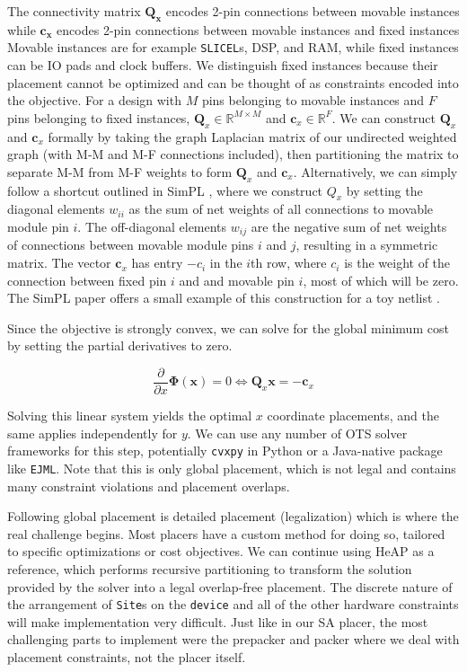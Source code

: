 The connectivity matrix $\boldsymbol{Q_x}$ encodes 2-pin connections between movable instances while $\boldsymbol{c_x}$ encodes 2-pin connections between movable instances and fixed instances   
Movable instances are for example \texttt{SLICEL}s, DSP, and RAM, while fixed instances can be IO pads and clock buffers.
We distinguish fixed instances because their placement cannot be optimized and can be thought of as constraints encoded into the objective.
For a design with $M$ pins belonging to movable instances and $F$ pins belonging to fixed instances, $\boldsymbol{Q}_x \in {\mathbb{R}}^{M \times M}$ and $\boldsymbol{c}_x \in {\mathbb{R}}^F$.
We can construct $\boldsymbol{Q}_x$ and $\boldsymbol{c}_x$ formally by taking the graph Laplacian matrix of our undirected weighted graph (with M-M and M-F connections included), then partitioning the matrix to separate M-M from M-F weights to form $\boldsymbol{Q}_x$ and $\boldsymbol{c}_x$.
Alternatively, we can simply follow a shortcut outlined in SimPL \cite{SimPL}, where we construct $Q_x$ by setting the diagonal elements $w_{ii}$ as the sum of net weights of all connections to movable module pin $i$.
The off-diagonal elements $w_{ij}$ are the negative sum of net weights of connections between movable module pins $i$ and $j$, resulting in a symmetric matrix.
The vector $\boldsymbol{c}_x$ has entry $-c_i$ in the $i$th row, where $c_i$ is the weight of the connection between fixed pin $i$ and and movable pin $i$, most of which will be zero.
The SimPL paper offers a small example of this construction for a toy netlist \cite{SimPL}.

Since the objective is strongly convex, we can solve for the global minimum cost by setting the partial derivatives to zero.

\begin{equation}
    \frac{\partial}{\partial x} \boldsymbol{\Phi} (\boldsymbol{x}) = 0 \Longleftrightarrow \boldsymbol{Q}_x \boldsymbol{x} = - \boldsymbol{c}_x
\end{equation}

Solving this linear system yields the optimal $x$ coordinate placements, and the same applies independently for $y$.
We can use any number of OTS solver frameworks for this step, potentially \texttt{cvxpy} in Python or a Java-native package like \texttt{EJML}.
Note that this is only global placement, which is not legal and contains many constraint violations and placement overlaps.

Following global placement is detailed placement (legalization) which is where the real challenge begins.
Most placers have a custom method for doing so, tailored to specific optimizations or cost objectives.
We can continue using HeAP as a reference, which performs recursive partitioning to transform the solution provided by the solver into a legal overlap-free placement.
The discrete nature of the arrangement of \texttt{Site}s on the \texttt{device} and all of the other hardware constraints will make implementation very difficult.
Just like in our SA placer, the most challenging parts to implement were the prepacker and packer where we deal with placement constraints, not the placer itself.

